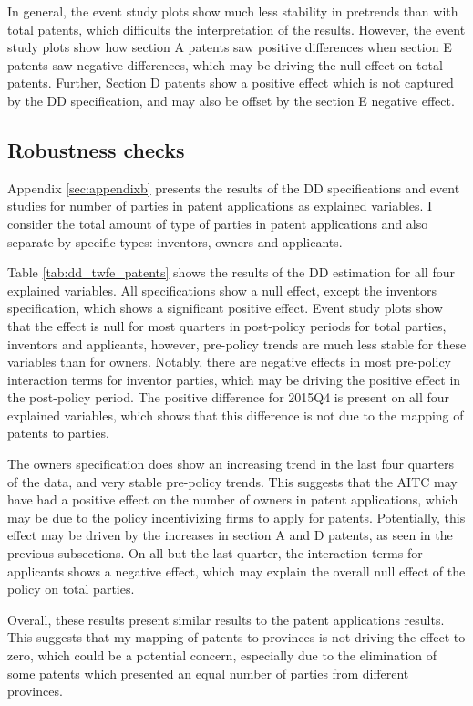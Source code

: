 \documentclass[../main.tex]{subfiles}
\begin{document}
In general, the event study plots show much less stability in pretrends than with total patents, which difficults the interpretation of the results. However, the event study plots show how section A patents saw positive differences when section E patents saw negative differences, which may be driving the null effect on total patents. Further, Section D patents show a positive effect which is not captured by the DD specification, and may also be offset by the section E negative effect.

\subsection{Robustness checks}

Appendix \ref{sec:appendixb} presents the results of the DD specifications and event studies for number of parties in patent applications as explained variables. I consider the total amount of type of parties in patent applications and also separate by specific types: inventors, owners and applicants. 

Table \ref{tab:dd_twfe_patents} shows the results of the DD estimation for all four explained variables. All specifications show a null effect, except the inventors specification, which shows a significant positive effect. Event study plots show that the effect is null for most quarters in post-policy periods for total parties, inventors and applicants, however, pre-policy trends are much less stable for these variables than for owners. Notably, there are negative effects in most pre-policy interaction terms for inventor parties, which may be driving the positive effect in the post-policy period. The positive difference for 2015Q4 is present on all four explained variables, which shows that this difference is not due to the mapping of patents to parties.

The owners specification does show an increasing trend in the last four quarters of the data, and very stable pre-policy trends. This suggests that the AITC may have had a positive effect on the number of owners in patent applications, which may be due to the policy incentivizing firms to apply for patents. Potentially, this effect may be driven by the increases in section A and D patents, as seen in the previous subsections. On all but the last quarter, the interaction terms for applicants shows a negative effect, which may explain the overall null effect of the policy on total parties.

Overall, these results present similar results to the patent applications results. This suggests that my mapping of patents to provinces is not driving the effect to zero, which could be a potential concern, especially due to the elimination of some patents which presented an equal number of parties from different provinces.
\end{document}

